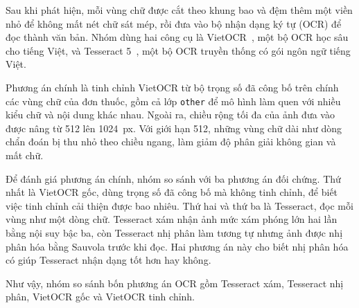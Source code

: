 Sau khi phát hiện, mỗi vùng chữ được cắt theo khung bao và đệm thêm một viền nhỏ để không mất nét chữ sát mép, rồi đưa vào bộ nhận dạng ký tự (OCR) để đọc thành văn bản.
Nhóm dùng hai công cụ là VietOCR~\cite{vietocr}, một bộ OCR học sâu cho tiếng Việt, và Tesseract 5~\cite{smith2007tesseract}, một bộ OCR truyền thống có gói ngôn ngữ tiếng Việt.

Phương án chính là tinh chỉnh VietOCR từ bộ trọng số đã công bố trên chính các vùng chữ của đơn thuốc, gồm cả lớp \texttt{other} để mô hình làm quen với nhiều kiểu chữ và nội dung khác nhau.
Ngoài ra, chiều rộng tối đa của ảnh đưa vào được nâng từ 512 lên 1024~px.
Với giới hạn 512, những vùng chữ dài như dòng chẩn đoán bị thu nhỏ theo chiều ngang, làm giảm độ phân giải không gian và mất chữ.

Để đánh giá phương án chính, nhóm so sánh với ba phương án đối chứng.
Thứ nhất là VietOCR gốc, dùng trọng số đã công bố mà không tinh chỉnh, để biết việc tinh chỉnh cải thiện được bao nhiêu.
Thứ hai và thứ ba là Tesseract, đọc mỗi vùng như một dòng chữ.
Tesseract xám nhận ảnh mức xám phóng lớn hai lần bằng nội suy bậc ba, còn Tesseract nhị phân làm tương tự nhưng ảnh được nhị phân hóa bằng Sauvola trước khi đọc.
Hai phương án này cho biết nhị phân hóa có giúp Tesseract nhận dạng tốt hơn hay không.

Như vậy, nhóm so sánh bốn phương án OCR gồm Tesseract xám, Tesseract nhị phân, VietOCR gốc và VietOCR tinh chỉnh.
